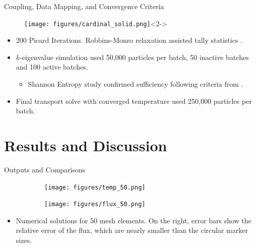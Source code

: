 \documentclass[9pt,t,aspectratio=169]{beamer}
\begin{document}
\begin{frame}{Coupling, Data Mapping, and Convergence Criteria}
    \pause
    \begin{figure}[T]
        \centering
        \texttt{[image: figures/cardinal\_solid.png]}<2->
    \end{figure}
    \begin{itemize}
        \item <3-> 200 Picard Iterations. Robbins-Monro relaxation assisted tally statistics \cite{dufek}.
        \item <4-> $k$-eigenvalue simulation used 50,000 particles per batch, 50 inactive batches and 100 active batches.
        \begin{itemize}
            \item <5-> Shannon Entropy study confirmed sufficiency following criteria from \cite{brown-entropy-2006}.
        \end{itemize}
        \item <6-> Final transport solve with converged temperature used 250,000 particles per batch.
    \end{itemize}
\end{frame}


\section{Results and Discussion}
\begin{frame}{Outputs and Comparisons}
    \pause
    \vspace*{-0.3cm}
    \begin{figure}[T]
        \hspace*{-1cm}
        \begin{subfigure}[b]{0.495\linewidth}
            \centering
            \texttt{[image: figures/temp\_50.png]}
        \end{subfigure}\hspace*{0.6cm}
        \begin{subfigure}[b]{0.495\linewidth}
        \centering
            \texttt{[image: figures/flux\_50.png]}
        \end{subfigure}
    \end{figure}
    \vspace{-0.25cm}
    \begin{itemize}
        \item Numerical solutions for 50 mesh elements. On the right, error bars show the relative error of the flux, which are nearly smaller than the circular marker sizes.
    \end{itemize}
\end{frame}
\end{document}
